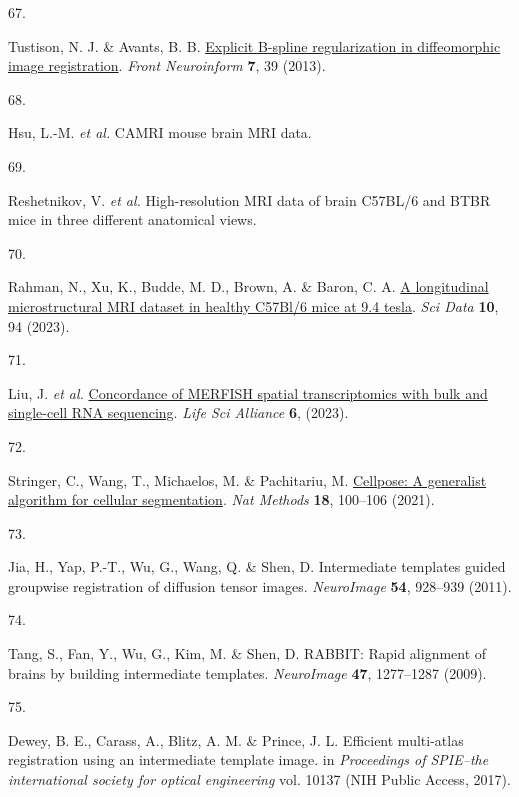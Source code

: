 \documentclass[
  12pt,
]{article}
\newlength{\cslhangindent}
\newlength{\csllabelwidth}
\newenvironment{CSLReferences}[2] %
 {\begin{list}{}{%
  \setlength{\itemindent}{0pt}
  \setlength{\leftmargin}{0pt}
  \setlength{\parsep}{0pt}
  \ifodd #1
   \setlength{\leftmargin}{\cslhangindent}
   \setlength{\itemindent}{-1\cslhangindent}
  \fi
  \setlength{\itemsep}{#2\baselineskip}}}
 {\end{list}}
\newcommand{\CSLLeftMargin}[1]{\parbox[t]{\csllabelwidth}{\strut#1\strut}}
\newcommand{\CSLRightInline}[1]{\parbox[t]{\linewidth - \csllabelwidth}{\strut#1\strut}}
\begin{document}
\begin{CSLReferences}{0}{0}
\CSLLeftMargin{67. }%
\CSLRightInline{Tustison, N. J. \& Avants, B. B.
\href{https://doi.org/10.3389/fninf.2013.00039}{Explicit {B}-spline
regularization in diffeomorphic image registration}. \emph{Front
Neuroinform} \textbf{7}, 39 (2013).}

\CSLLeftMargin{68. }%
\CSLRightInline{Hsu, L.-M. \emph{et al.} CAMRI mouse brain MRI data.}

\CSLLeftMargin{69. }%
\CSLRightInline{Reshetnikov, V. \emph{et al.} High-resolution MRI data
of brain C57BL/6 and BTBR mice in three different anatomical views.}

\CSLLeftMargin{70. }%
\CSLRightInline{Rahman, N., Xu, K., Budde, M. D., Brown, A. \& Baron, C.
A. \href{https://doi.org/10.1038/s41597-023-01942-5}{A longitudinal
microstructural MRI dataset in healthy C57Bl/6 mice at 9.4 tesla}.
\emph{Sci Data} \textbf{10}, 94 (2023).}

\CSLLeftMargin{71. }%
\CSLRightInline{Liu, J. \emph{et al.}
\href{https://doi.org/10.26508/lsa.202201701}{Concordance of MERFISH
spatial transcriptomics with bulk and single-cell RNA sequencing}.
\emph{Life Sci Alliance} \textbf{6}, (2023).}

\CSLLeftMargin{72. }%
\CSLRightInline{Stringer, C., Wang, T., Michaelos, M. \& Pachitariu, M.
\href{https://doi.org/10.1038/s41592-020-01018-x}{Cellpose: A generalist
algorithm for cellular segmentation}. \emph{Nat Methods} \textbf{18},
100--106 (2021).}

\CSLLeftMargin{73. }%
\CSLRightInline{Jia, H., Yap, P.-T., Wu, G., Wang, Q. \& Shen, D.
Intermediate templates guided groupwise registration of diffusion tensor
images. \emph{NeuroImage} \textbf{54}, 928--939 (2011).}

\CSLLeftMargin{74. }%
\CSLRightInline{Tang, S., Fan, Y., Wu, G., Kim, M. \& Shen, D. RABBIT:
Rapid alignment of brains by building intermediate templates.
\emph{NeuroImage} \textbf{47}, 1277--1287 (2009).}

\CSLLeftMargin{75. }%
\CSLRightInline{Dewey, B. E., Carass, A., Blitz, A. M. \& Prince, J. L.
Efficient multi-atlas registration using an intermediate template image.
in \emph{Proceedings of SPIE--the international society for optical
engineering} vol. 10137 (NIH Public Access, 2017).}


\end{CSLReferences}
\end{document}
